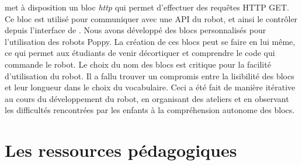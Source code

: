                  met à disposition un bloc \textit{http} qui permet d'effectuer des requêtes HTTP GET. Ce bloc est utilisé pour communiquer avec une API du robot, et ainsi le contrôler depuis l'interface de . Nous avons développé des blocs personnalisés pour l'utilisation des robots Poppy. La création de ces blocs peut se faire en  lui même, ce qui permet aux étudiants de venir décortiquer et comprendre le code qui commande le robot.
                Le choix du nom des blocs est critique pour la facilité d'utilisation du robot. Il a fallu trouver un compromis entre la lisibilité des blocs et leur longueur dans le choix du vocabulaire. Ceci a été fait de manière itérative au cours du développement du robot, en organisant des ateliers et en observant les difficultés rencontrées par les enfants à la compréhension autonome des blocs.
\section{Les ressources pédagogiques}
